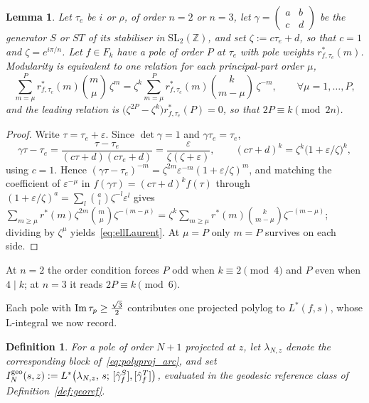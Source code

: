 \documentclass[11pt]{article}
\newtheorem{lemma}[theorem]{Lemma}
\newtheorem{definition}[theorem]{Definition}
\newcommand{\ZZ}{\mathbb{Z}}
\newcommand{\SLZ}{\mathrm{SL}_2(\ZZ)}
\begin{document}
\begin{lemma}\label{lem:ellLaurent}
Let $\tau_e$ be $i$ or $\rho$, of order $n=2$ or $n=3$, let
$\gamma=\left(\begin{smallmatrix}a&b\\c&d\end{smallmatrix}\right)$ be the generator $S$ or $ST$ of
its stabiliser in $\SLZ$, and set $\zeta:=c\tau_e+d$, so that $c=1$ and $\zeta=e^{i\pi/n}$. Let
$f\in F_k$ have a pole of order $P$ at $\tau_e$ with pole weights $r^*_{f,\tau_e}(m)$. Modularity is
equivalent to one relation for each principal-part order $\mu$,
\begin{equation}\label{eq:ellLaurent}
\sum_{m=\mu}^{P} r^*_{f,\tau_e}(m)\binom{m}{\mu}\,\zeta^{m}
=\zeta^{k}\sum_{m=\mu}^{P} r^*_{f,\tau_e}(m)\binom{k}{m-\mu}\,\zeta^{-m},
\qquad \forall\mu=1,\dots,P,
\end{equation}
and the leading relation is $\big(\zeta^{2P}-\zeta^{k}\big)r^*_{f,\tau_e}(P)=0$, so that
$2P\equiv k \pmod{2n}$.
\end{lemma}
\begin{proof}
Write $\tau=\tau_e+\varepsilon$. Since $\det\gamma=1$ and $\gamma\tau_e=\tau_e$,
\begin{equation}\label{eq:ellshift}
\gamma\tau-\tau_e=\frac{\tau-\tau_e}{(c\tau+d)(c\tau_e+d)}=\frac{\varepsilon}{\zeta(\zeta+\varepsilon)},
\qquad (c\tau+d)^{k}=\zeta^{k}\big(1+\varepsilon/\zeta\big)^{k},
\end{equation}
using $c=1$. Hence $(\gamma\tau-\tau_e)^{-m}=\zeta^{2m}\varepsilon^{-m}(1+\varepsilon/\zeta)^{m}$,
and matching the coefficient of $\varepsilon^{-\mu}$ in $f(\gamma\tau)=(c\tau+d)^{k}f(\tau)$
through $(1+\varepsilon/\zeta)^{a}=\sum_{l}\binom{a}{l}\zeta^{-l}\varepsilon^{l}$ gives
$\sum_{m\ge\mu}r^*(m)\zeta^{2m}\binom{m}{\mu}\zeta^{-(m-\mu)}
=\zeta^{k}\sum_{m\ge\mu}r^*(m)\binom{k}{m-\mu}\zeta^{-(m-\mu)}$; dividing by $\zeta^{\mu}$
yields~\eqref{eq:ellLaurent}. At $\mu=P$ only $m=P$ survives on each side.
\end{proof}

At $n=2$ the order condition forces $P$ odd when $k\equiv2\pmod4$ and $P$ even when $4\mid k$; at
$n=3$ it reads $2P\equiv k\pmod 6$.

Each pole with ${\rm Im}\,\tau_p\ge\tfrac{\sqrt3}{2}$ contributes one projected polylog to
$L^*(f,s)$, whose L-integral we now record.

\begin{definition}\label{def:geoIN}
For a pole of order $N+1$ projected at $z$, let $\lambda_{N,z}$ denote the corresponding block
of~\eqref{eq:polyproj_arc}, and set
$I^{\rm geo}_N(s,z):=L^*\big(\lambda_{N,z},\,s;\,[\hat\gamma^S_f],[\hat\gamma^T_f]\big)$,
evaluated in the geodesic reference class of Definition~\ref{def:georef}.
\end{definition}
\end{document}
